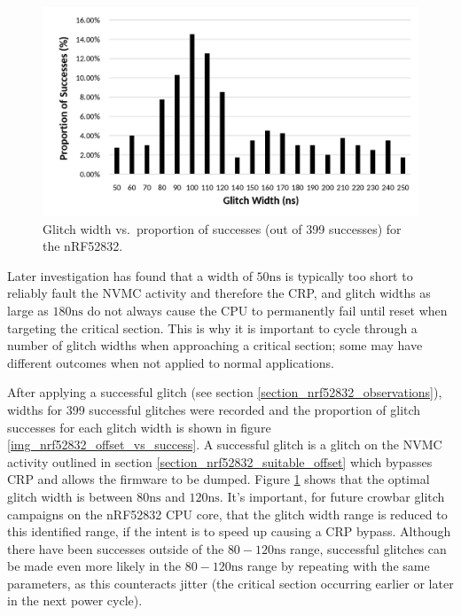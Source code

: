 \begin{figure}
\centering
\includegraphics[width=5.20833in,height=\textheight]{res/nrf52832_width_vs_success.png}
\caption{Glitch width vs.~proportion of successes (out of 399 successes)
for the nRF52832.\label{img_nrf52832_width_vs_success}}
\end{figure}

Later investigation has found that a width of \(50\si{\nano\second}\) is
typically too short to reliably fault the NVMC activity and therefore
the CRP, and glitch widths as large as \(180\si{\nano\second}\) do not
always cause the CPU to permanently fail until reset when targeting the
critical section. This is why it is important to cycle through a number
of glitch widths when approaching a critical section; some may have
different outcomes when not applied to normal applications.

\newpage

After applying a successful glitch (see section
\ref{section_nrf52832_observations}), widths for 399 successful glitches
were recorded and the proportion of glitch successes for each glitch
width is shown in figure \ref{img_nrf52832_offset_vs_success}. A
successful glitch is a glitch on the NVMC activity outlined in section
\ref{section_nrf52832_suitable_offset} which bypasses CRP and allows the
firmware to be dumped. Figure \ref{img_nrf52832_width_vs_success} shows
that the optimal glitch width is between \(80\si{\nano\second}\) and
\(120\si{\nano\second}\). It's important, for future crowbar glitch
campaigns on the nRF52832 CPU core, that the glitch width range is
reduced to this identified range, if the intent is to speed up causing a
CRP bypass. Although there have been successes outside of the
\(80-120\si{\nano\second}\) range, successful glitches can be made even
more likely in the \(80-120\si{\nano\second}\) range by repeating with
the same parameters, as this counteracts jitter (the critical section
occurring earlier or later in the next power cycle).

